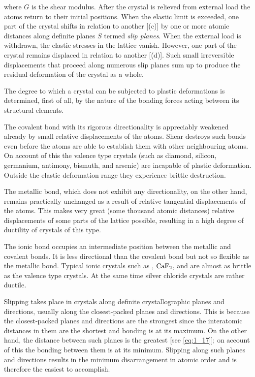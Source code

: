 \noindent
where $G$ is the shear modulus. After the crystal is relieved from external load the atoms return to their initial positions. When the elastic limit is exceeded, one part of the crystal shifts in relation to another [(c)] by one or more atomic distances along definite planes $S$ termed \textit{slip planes}. When the external load is withdrawn, the elastic stresses in the lattice vanish. However, one part of the crystal remains displaced in relation to another [(d)]. Such small irreversible displacements that proceed along numerous slip planes sum up to produce the residual deformation of the crystal as a whole.

The degree to which a crystal can be subjected to plastic deformations is determined, first of all, by the nature of the bonding forces acting between its structural elements.

The covalent bond with its rigorous directionality is appreciably weakened already by small relative displacements of the atoms. Shear destroys such bonds even before the atoms are able to establish them with other neighbouring atoms. On account of this the valence type crystals (such as diamond, silicon, germanium, antimony, bismuth, and arsenic) are incapable of plastic deformation. Outside the elastic deformation range they experience brittle destruction.

The metallic bond, which does not exhibit any directionality, on the other hand, remains practically unchanged as a result of relative tangential displacements of the atoms. This makes very great (some thousand atomic distances) relative displacements of some parts of the lattice possible, resulting in a high degree of ductility of crystals of this type.

The ionic bond occupies an intermediate position between the metallic and covalent bonds. It is less directional than the covalent bond but not so flexible as the metallic bond. Typical ionic crystals such as , $\ce{CaF2}$, and  are almost as brittle as the valence type crystals. At the same time silver chloride crystals are rather ductile.

Slipping takes place in crystals along definite crystallographic planes and directions, usually along the closest-packed planes and directions. This is because the closest-packed planes and directions are the strongest since the interatomic distances in them are the shortest and bonding is at its maximum. On the other hand, the distance between such planes is the greatest [see \eqref{eq:1_17}]; on account of this the bonding between them is at its minimum. Slipping along such planes and directions results in the minimum disarrangement in atomic order and is therefore the easiest to accomplish.

